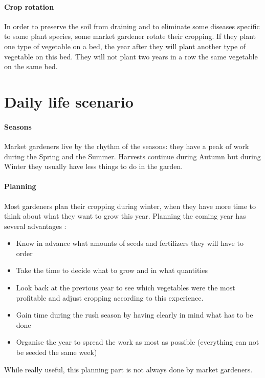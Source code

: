 \paragraph{Crop rotation} In order to preserve the soil from draining and to eliminate some diseases specific to some plant species, some market gardener rotate their cropping. If they plant one type of vegetable on a bed, the year after they will plant another type of vegetable on this bed. They will not plant two years in a row the same vegetable on the same bed.

\section{Daily life scenario}

\paragraph{Seasons} Market gardeners live by the rhythm of the seasons: they have a peak of work during the Spring and the Summer. Harvests continue during Autumn but during Winter they usually have less things to do in the garden. 

\paragraph{Planning}

Most gardeners plan their cropping during winter\cite{planification-methodology}, when they have more time to think about what they want to grow this year. Planning the coming year has several advantages : 

\begin{itemize}
	\item Know in advance what amounts of seeds and fertilizers they will have to order
	\item Take the time to decide what to grow and in what quantities
	\item Look back at the previous year to see which vegetables were the most profitable and adjust cropping according to this experience.
	\item Gain time during the rush season by having clearly in mind what has to be done
	\item Organise the year to spread the work as most as possible (everything can not be seeded the same week)
\end{itemize}

While really useful, this planning part is not always done by market gardeners. 

